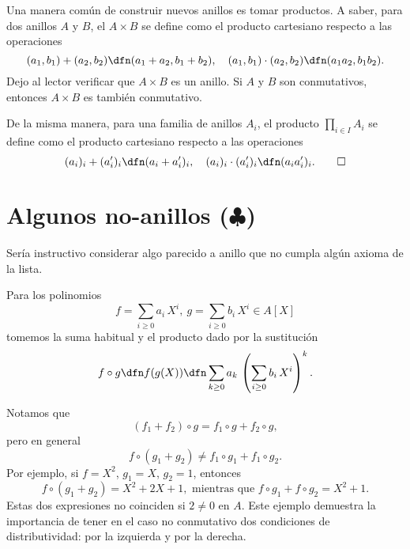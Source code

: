 \begin{ejemplo}
  Una manera común de construir nuevos anillos es tomar productos. A saber, para
  dos anillos $A$ y $B$, el  $A\times B$ se define como
  el producto cartesiano respecto a las operaciones
  \[ (a_1,b_1) + (a_2,b_2) \dfn (a_1+a_2, b_1+b_2), \quad
    (a_1,b_1) \cdot (a_2,b_2) \dfn (a_1 a_2, b_1 b_2). \]
  Dejo al lector verificar que $A\times B$ es un anillo. Si $A$ y $B$ son
  conmutativos, entonces $A\times B$ es también conmutativo.

  De la misma manera, para una familia de anillos $A_i$, el producto
  $\prod_{i\in I} A_i$ se define como el producto cartesiano respecto a las
  operaciones
  \[ (a_i)_i + (a_i')_i \dfn (a_i+a_i')_i, \quad
    (a_i)_i \cdot (a_i')_i \dfn (a_i a_i')_i. \qedhere \]
\end{ejemplo}


\section{Algunos no-anillos ($\clubsuit$)}

Sería instructivo considerar algo parecido a anillo que no cumpla algún axioma
de la lista.

\begin{ejemplo}
  Para los polinomios
  $$f = \sum_{i\ge 0} a_i\,X^i, ~ g = \sum_{i\ge 0} b_i\,X^i \in A [X]$$
  tomemos la suma habitual y el producto dado por la sustitución
  $$f \circ g \dfn f (g (X)) \dfn \sum_{k\ge 0} a_k\,\left(\sum_{i\ge 0} b_i\,X^i\right)^k.$$

  Notamos que
  $$(f_1 + f_2)\circ g = f_1\circ g + f_2\circ g,$$
  pero en general
  $$f\circ (g_1 + g_2) \ne f_1\circ g_1 + f_1\circ g_2.$$
  Por ejemplo, si $f = X^2$, $g_1 = X$, $g_2 = 1$, entonces
  $$f\circ (g_1 + g_2) = X^2 + 2X + 1, \text{ mientras que } f\circ g_1 + f\circ g_2 = X^2 + 1.$$
  Estas dos expresiones no coinciden si $2 \ne 0$ en $A$. Este ejemplo demuestra
  la importancia de tener en el caso no conmutativo dos condiciones de
  distributividad: por la izquierda y por la derecha.
\end{ejemplo}

